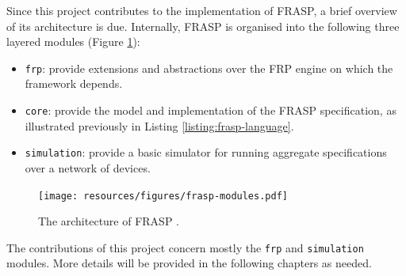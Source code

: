 Since this project contributes to the implementation of FRASP, a brief overview
of its architecture is due. Internally, FRASP is organised into the following
three layered modules (Figure \ref{figure:frasp-modules}):
\begin{itemize}
  \item \texttt{frp}: provide extensions and abstractions over the \ac{FRP}
        engine on which the framework depends.
  \item \texttt{core}: provide the model and implementation of the FRASP
        specification, as illustrated previously in Listing
        \ref{listing:frasp-language}.
  \item \texttt{simulation}: provide a basic simulator for running aggregate
        specifications over a network of devices.
\end{itemize}
\begin{figure}[h]
  \centering
  \texttt{[image: resources/figures/frasp-modules.pdf]}
  \caption{The architecture of FRASP \cite{FRASP}.}
  \label{figure:frasp-modules}
\end{figure}

The contributions of this project concern mostly the \texttt{frp} and
\texttt{simulation} modules. More details will be provided in the following
chapters as needed.

